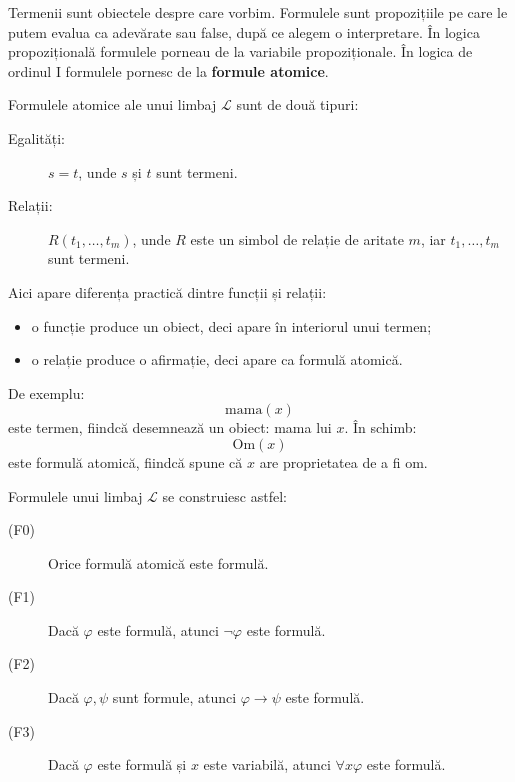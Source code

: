 Termenii sunt obiectele despre care vorbim. Formulele sunt propozițiile pe care le putem evalua ca adevărate sau false, după ce alegem o interpretare.
În logica propozițională formulele porneau de la variabile propoziționale. În logica de ordinul I formulele pornesc de la \textbf{formule atomice}.

\begin{definition}
	Formulele atomice ale unui limbaj \( \mathcal{L} \) sunt de două tipuri:

	\begin{description}
		\item[Egalități:] \(s = t\), unde \(s\) și \(t\) sunt termeni.
		\item[Relații:] \(R(t_1, \dots, t_m)\), unde \(R\) este un simbol de relație de aritate \(m\), iar \(t_1, \dots, t_m\) sunt termeni.
	\end{description}
\end{definition}

Aici apare diferența practică dintre funcții și relații:

\begin{itemize}
	\item o funcție produce un obiect, deci apare în interiorul unui termen;
	\item o relație produce o afirmație, deci apare ca formulă atomică.
\end{itemize}

De exemplu:
\[
	\mathrm{mama}(x)
\]
este termen, fiindcă desemnează un obiect: mama lui \(x\). În schimb:
\[
	\mathrm{Om}(x)
\]
este formulă atomică, fiindcă spune că \(x\) are proprietatea de a fi om.

\begin{definition}
	Formulele unui limbaj \( \mathcal{L} \) se construiesc astfel:

	\begin{description}
		\item[(F0)] Orice formulă atomică este formulă.
		\item[(F1)] Dacă \( \varphi \) este formulă, atunci \( \neg \varphi \) este formulă.
		\item[(F2)] Dacă \( \varphi, \psi \) sunt formule, atunci \( \varphi \to \psi \) este formulă.
		\item[(F3)] Dacă \( \varphi \) este formulă și \(x\) este variabilă, atunci \( \forall x \varphi \) este formulă.
	\end{description}
\end{definition}

